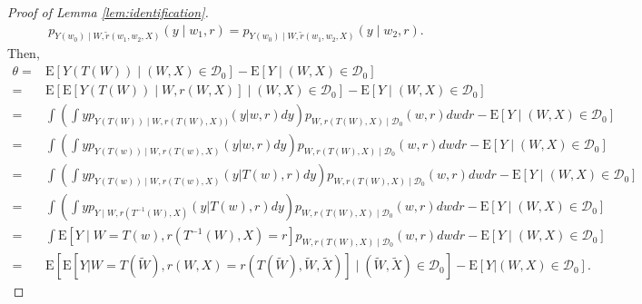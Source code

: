\documentclass[11pt]{article}
\def\E{{\mathrm E}}
\numberwithin{equation}{section}
\theoremstyle{definition}
\begin{document}
\begin{proof}[Proof of Lemma \ref{lem:identification}]
\begin{align*}
        p_{Y(w_0)\mid W,\tilde{r}(w_1,w_2,X)}(y\mid w_1,r) = p_{Y(w_0)\mid W,\tilde{r}(w_1,w_2,X)}(y\mid w_2,r).
    \end{align*}
    Then,
    \begin{align*}
        \theta=&\E[Y(T(W))\mid (W,X)\in\mathcal{D}_0]-\E[Y\mid (W,X)\in\mathcal{D}_0]\\
        =&\E[\E[Y(T(W))\mid W,r(W,X)]\mid (W,X)\in\mathcal{D}_0]-\E[Y\mid (W,X)\in\mathcal{D}_0]\\
        =&\int\left(\int yp_{Y(T(W))\mid W,r(T(W),X))}(y|w,r)dy\right)p_{W,r(T(W),X)\mid\mathcal{D}_0}(w,r)dwdr-\E[Y\mid (W,X)\in\mathcal{D}_0]\\
        =&\int\left(\int yp_{Y(T(w))\mid W,r(T(w),X)}(y|w,r)dy\right)p_{W,r(T(W),X)\mid\mathcal{D}_0}(w,r)dwdr-\E[Y\mid (W,X)\in\mathcal{D}_0]\\
        =&\int\left(\int yp_{Y(T(w))\mid W,r(T(w),X)}(y|T(w),r)dy\right)p_{W,r(T(W),X)\mid\mathcal{D}_0}(w,r)dwdr-\E[Y\mid (W,X)\in\mathcal{D}_0]\\
        =&\int\left(\int yp_{Y\mid W,r(T^{-1}(W),X)}(y|T(w),r)dy\right)p_{W,r(T(W),X)\mid\mathcal{D}_0}(w,r)dwdr-\E[Y\mid (W,X)\in\mathcal{D}_0]\\
        =&\int\E[Y\mid W=T(w),r(T^{-1}(W),X)=r]p_{W,r(T(W),X)\mid\mathcal{D}_0}(w,r)dwdr-\E[Y\mid (W,X)\in\mathcal{D}_0]\\
        =&\E\left[\E\left[Y|W=T(\tilde{W}),r(W,X)=r(T(\tilde{W}),\tilde{W},\tilde{X})\right]\mid (\tilde{W},\tilde{X})\in\mathcal{D}_0\right]-\E\left[Y|(W,X) \in \mathcal{D}_0\right].
    \end{align*}
    
\end{proof}
\end{document}
